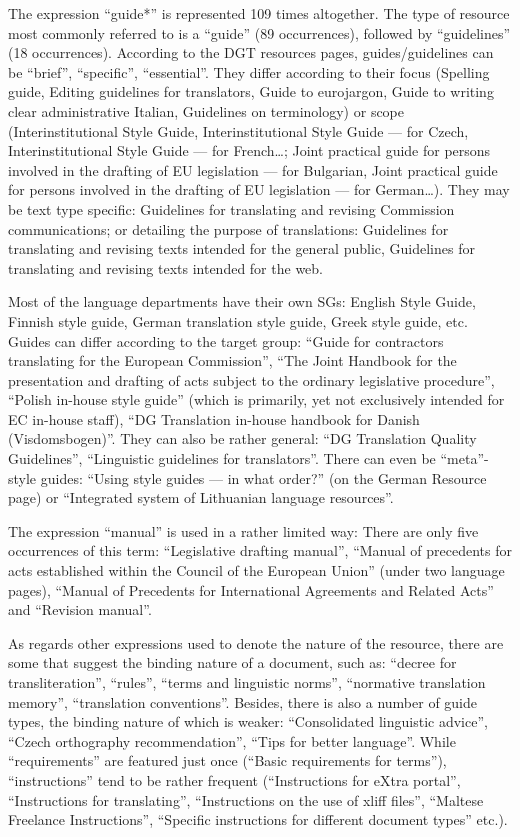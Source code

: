\documentclass[output=paper]{langsci/langscibook}
\begin{document}
The expression “guide*” is represented 109 times altogether. The type of resource most commonly referred to is a “guide” (89 occurrences), followed by “guidelines” (18 occurrences). According to the DGT resources pages, guides/guidelines can be “brief”, “specific”, “essential”. They differ according to their focus (Spelling guide, Editing guidelines for translators, Guide to eurojargon, Guide to writing clear administrative Italian, Guidelines on terminology) or scope (Interinstitutional Style Guide, Interinstitutional Style Guide — for Czech, Interinstitutional Style Guide — for French…; Joint practical guide for persons involved in the drafting of EU legislation — for Bulgarian, Joint practical guide for persons involved in the drafting of EU legislation — for German…). They may be text type specific: Guidelines for translating and revising Commission communications; or detailing the purpose of translations: Guidelines for translating and revising texts intended for the general public, Guidelines for translating and revising texts intended for the web.

Most of the language departments have their own SGs: English Style Guide, Finnish style guide, German translation style guide, Greek style guide, etc. Guides can differ according to the target group: “Guide for contractors translating for the European Commission”, “The Joint Handbook for the presentation and drafting of acts subject to the ordinary legislative procedure”, “Polish in-house style guide” (which is primarily, yet not exclusively intended for EC in-house staff), “DG Translation in-house handbook for Danish (Visdomsbogen)”. They can also be rather general: “DG Translation Quality Guidelines”, “Linguistic guidelines for translators”. There can even be “meta”-style guides: “Using style guides — in what order?” (on the German Resource page) or “Integrated system of Lithuanian language resources”.

The expression “manual” is used in a rather limited way: There are only five occurrences of this term: “Legislative drafting manual”, “Manual of precedents for acts established within the Council of the European Union” (under two language pages), “Manual of Precedents for International Agreements and Related Acts” and “Revision manual”. 

As regards other expressions used to denote the nature of the resource, there are some that suggest the binding nature of a document, such as: “decree for transliteration”, “rules”, “terms and linguistic norms”, “normative translation memory”, “translation conventions”. Besides, there is also a number of guide types, the binding nature of which is weaker: “Consolidated linguistic advice”, “Czech orthography recommendation”, “Tips for better language”. While “requirements” are featured just once (“Basic requirements for terms”), “instructions” tend to be rather frequent (“Instructions for eXtra portal”, “Instructions for translating”, “Instructions on the use of xliff files”, “Maltese Freelance Instructions”, “Specific instructions for different document types” etc.).
\end{document}
